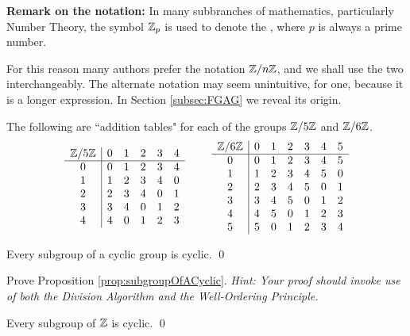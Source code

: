 \documentclass[../algebraNotesMSRI-UP2016.tex]{subfiles}
\begin{document}
\begin{frame}[c]{}
\textbf{Remark on the notation:} In many subbranches of mathematics, particularly Number Theory, the symbol $\mathbb Z_p$ is used to denote the , where $p$ is always a prime number.    

\smallGap
For this reason many authors prefer the notation $\mathbb Z/n\mathbb Z$, and we shall use the two interchangeably.  The alternate notation may seem unintuitive, for one, because it is a longer expression.  In Section \ref{subsec:FGAG} we reveal its origin.   
\end{frame}

\begin{frame}[c]{}{}
\begin{ex}[cf. Problem 56]
The following are ``addition tables" for each of the groups $\mathbb Z/5\mathbb Z$ 
and $\mathbb Z/6\mathbb Z$.
\[
\begin{array}{c | c c c c c }
 \Z/5\Z & 0 & 1 & 2 & 3 & 4 \\
 \hline
 0 & 0 & 1 & 2 & 3 & 4 \\ 
 1 & 1 & 2 & 3 & 4 & 0 \\
 2 & 2 & 3 & 4 & 0 & 1 \\
 3 & 3 & 4 & 0 & 1 & 2 \\
 4 & 4 & 0 & 1 & 2 & 3 
\end{array}
\hspace{2pc}
\begin{array}{c | c c c c c c }
 \Z/6\Z & 0 & 1 & 2 & 3 & 4 & 5 \\
 \hline
 0 & 0 & 1 & 2 & 3 & 4 & 5 \\ 
 1 & 1 & 2 & 3 & 4 & 5 & 0 \\
 2 & 2 & 3 & 4 & 5 & 0 & 1 \\
 3 & 3 & 4 & 5 & 0 & 1 & 2 \\
 4 & 4 & 5 & 0 & 1 & 2 & 3 \\
 5 & 5 & 0 & 1 & 2 & 3 & 4
\end{array}
\]	
\end{ex}
\end{frame}

\begin{frame}[c]
\begin{prop}\label{prop:subgroupOfACyclic}
Every subgroup of a cyclic group is cyclic.
\qed
\end{prop}

\smallGap
\begin{UNABexe}\label{exe:subgroupOfACyclic}
Prove Proposition \ref{prop:subgroupOfACyclic}.  \textit{Hint: Your proof should invoke use of both the Division Algorithm and the Well-Ordering Principle.}  
\end{UNABexe}

\smallGap
\begin{cor}
Every subgroup of $\mathbb Z$ is cyclic.
\qed
\end{cor}
\end{frame}
\end{document}
